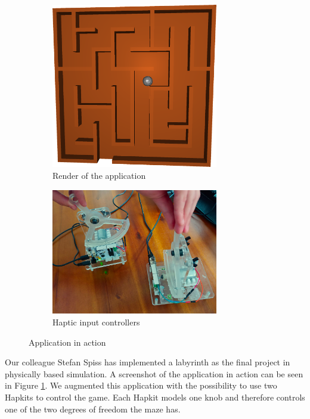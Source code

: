 \documentclass[]{article}
\begin{document}
\begin{figure}[h!]
    \begin{subfigure}{0.5\textwidth}
        \centering
        \includegraphics[width=0.8\textwidth]{./labyrinthRender.png}
        \caption*{Render of the application}
    \end{subfigure}%
    \begin{subfigure}{0.5\textwidth}
        \centering
        \includegraphics[width=0.8\textwidth]{./hapkitHandles.jpg}
        \caption*{Haptic input controllers}
    \end{subfigure}
    \caption{Application in action}
    \label{fig:app}
\end{figure}

Our colleague Stefan Spiss has implemented a labyrinth as the final
project in physically based simulation. A screenshot of the application
in action can be seen in Figure \ref{fig:app}. We augmented this
application with the possibility to use two Hapkits to control the game.
Each Hapkit models one knob and therefore controls one of the two
degrees of freedom the maze has.
\end{document}
